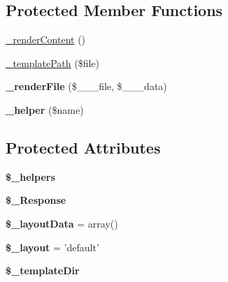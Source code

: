 \subsection*{Protected Member Functions}
\begin{DoxyCompactItemize}
\item 
\hyperlink{classView_a9f84b28f6e760240626aac39e0f21d02}{\_\-renderContent} ()
\item 
\hyperlink{classView_a0ff5857aa83ff98b3eb7e6067469cd54}{\_\-templatePath} (\$file)
\item 
\hypertarget{classView_ab0a86a216c1ad07e4580a4574f9b32e9}{
{\bfseries \_\-renderFile} (\$\_\-\_\-\_\-file, \$\_\-\_\-\_\-data)}
\label{classView_ab0a86a216c1ad07e4580a4574f9b32e9}

\item 
\hypertarget{classView_abe4a1f48ac5a9a9ebfd7a9292a8db663}{
{\bfseries \_\-helper} (\$name)}
\label{classView_abe4a1f48ac5a9a9ebfd7a9292a8db663}

\end{DoxyCompactItemize}
\subsection*{Protected Attributes}
\begin{DoxyCompactItemize}
\item 
\hypertarget{classView_a9896fc61a6f4aebec58668abf395db23}{
{\bfseries \$\_\-helpers}}
\label{classView_a9896fc61a6f4aebec58668abf395db23}

\item 
\hypertarget{classView_ad18c95369471c2fb61d0741b8d4040de}{
{\bfseries \$\_\-Response}}
\label{classView_ad18c95369471c2fb61d0741b8d4040de}

\item 
\hypertarget{classView_afdee45797fa2902521e300d19383cec8}{
{\bfseries \$\_\-layoutData} = array()}
\label{classView_afdee45797fa2902521e300d19383cec8}

\item 
\hypertarget{classView_a78921c86c8bc1798465462b9f0704e09}{
{\bfseries \$\_\-layout} = 'default'}
\label{classView_a78921c86c8bc1798465462b9f0704e09}

\item 
\hypertarget{classView_aa46abe6eae0fa132506c23fa782c1d5e}{
{\bfseries \$\_\-templateDir}}
\label{classView_aa46abe6eae0fa132506c23fa782c1d5e}

\end{DoxyCompactItemize}


